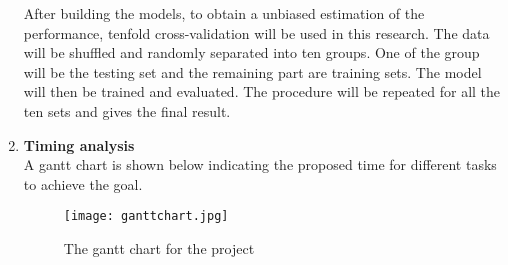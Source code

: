 \documentclass[ a4paper, 12pt, oneside ]{article} %
\begin{document}
\begin{enumerate}
\begin{itemize}
\end{itemize}
After building the models, to obtain a unbiased estimation of the performance, tenfold cross-validation will be used in this research. The data will be shuffled and randomly separated into ten groups. One of the group will be the testing set and the remaining part are training sets. The model will then be trained and evaluated. The procedure will be repeated for all the ten sets and gives the final result.\\
\item \textbf{Timing analysis}\\
A gantt chart is shown below indicating the proposed time for different tasks to achieve the goal.
\begin{figure}[h] 
\centering
\texttt{[image: ganttchart.jpg]} 
\caption{The gantt chart for the project}
\label{Fig:GanttChart}
\end{figure} 
\end{enumerate}

 
\newpage
\end{document}
